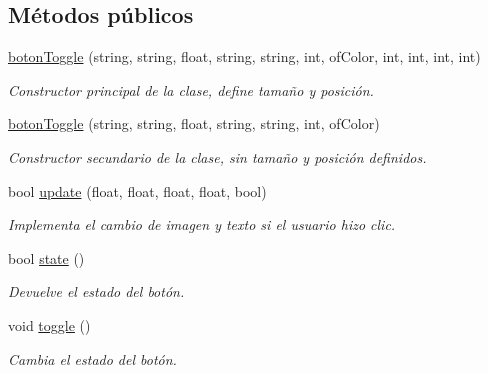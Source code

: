 \subsection*{Métodos públicos}
\begin{DoxyCompactItemize}
\item 
\hyperlink{classboton_toggle_a53ca0ae03d7125318e8b88993f8ed936}{boton\+Toggle} (string, string, float, string, string, int, of\+Color, int, int, int, int)
\begin{DoxyCompactList}\small\item\em Constructor principal de la clase, define tamaño y posición. \end{DoxyCompactList}\item 
\hyperlink{classboton_toggle_ad193dda2df6e4399a3171a2d5ecc612f}{boton\+Toggle} (string, string, float, string, string, int, of\+Color)
\begin{DoxyCompactList}\small\item\em Constructor secundario de la clase, sin tamaño y posición definidos. \end{DoxyCompactList}\item 
bool \hyperlink{classboton_toggle_a067fa2bd02fd019d5c6c062ec8d521c0}{update} (float, float, float, float, bool)
\begin{DoxyCompactList}\small\item\em Implementa el cambio de imagen y texto si el usuario hizo clic. \end{DoxyCompactList}\item 
bool \hyperlink{classboton_toggle_a6da75216bda1e716f10cb1baec792cd0}{state} ()
\begin{DoxyCompactList}\small\item\em Devuelve el estado del botón. \end{DoxyCompactList}\item 
void \hyperlink{classboton_toggle_a5a24ccd035199173e96b36a9dec4927f}{toggle} ()
\begin{DoxyCompactList}\small\item\em Cambia el estado del botón. \end{DoxyCompactList}\end{DoxyCompactItemize}
